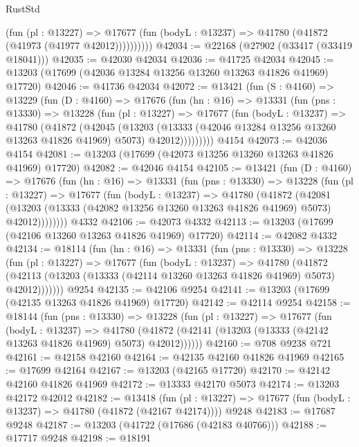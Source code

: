 \begin{lexlean}{RustStd}
\begin{coremodule}
              (fun (pl : @13227) =>
              @17677 (fun (bodyL : @13237) => @41780 (@41872 (@41973 (@41977 @42012))))))))))
@42034 := @22168 (@27902 (@33417 (@33419 @18041)))
@42035 := @42030 @42034
@42036 := @41725 @42034
@42045 := @13203 (@17699 (@42036 @13284 @13256 @13260 @13263 @41826 @41969) @17720)
@42046 := @41736 @42034
@42072 := @13421
    (fun (S : @4160) =>
    @13229
      (fun (D : @4160) =>
      @17676
        (fun (hn : @16) =>
        @13331
          (fun (pns : @13330) =>
          @13228
            (fun (pl : @13227) =>
            @17677
              (fun (bodyL : @13237) =>
              @41780
                (@41872
                  (@42045
                    (@13203
                      (@13333 (@42046 @13284 @13256 @13260 @13263 @41826 @41969) @5073)
                      @42012)))))))))
    @4154
@42073 := @42036 @4154
@42081 := @13203 (@17699 (@42073 @13256 @13260 @13263 @41826 @41969) @17720)
@42082 := @42046 @4154
@42105 := @13421
    (fun (D : @4160) =>
    @17676
      (fun (hn : @16) =>
      @13331
        (fun (pns : @13330) =>
        @13228
          (fun (pl : @13227) =>
          @17677
            (fun (bodyL : @13237) =>
            @41780
              (@41872
                (@42081
                  (@13203 (@13333 (@42082 @13256 @13260 @13263 @41826 @41969) @5073) @42012))))))))
    @4332
@42106 := @42073 @4332
@42113 := @13203 (@17699 (@42106 @13260 @13263 @41826 @41969) @17720)
@42114 := @42082 @4332
@42134 := @18114
    (fun (hn : @16) =>
    @13331
      (fun (pns : @13330) =>
      @13228
        (fun (pl : @13227) =>
        @17677
          (fun (bodyL : @13237) =>
          @41780
            (@41872
              (@42113 (@13203 (@13333 (@42114 @13260 @13263 @41826 @41969) @5073) @42012)))))))
    @9254
@42135 := @42106 @9254
@42141 := @13203 (@17699 (@42135 @13263 @41826 @41969) @17720)
@42142 := @42114 @9254
@42158 := @18144
    (fun (pns : @13330) =>
    @13228
      (fun (pl : @13227) =>
      @17677
        (fun (bodyL : @13237) =>
        @41780 (@41872 (@42141 (@13203 (@13333 (@42142 @13263 @41826 @41969) @5073) @42012))))))
@42160 := @708 @9238 @721
@42161 := @42158 @42160
@42164 := @42135 @42160 @41826 @41969
@42165 := @17699 @42164
@42167 := @13203 (@42165 @17720)
@42170 := @42142 @42160 @41826 @41969
@42172 := @13333 @42170 @5073
@42174 := @13203 @42172 @42012
@42182 := @13418
    (fun (pl : @13227) => @17677 (fun (bodyL : @13237) => @41780 (@41872 (@42167 @42174))))
    @9248
@42183 := @17687 @9248
@42187 := @13203 (@41722 (@17686 (@42183 @40766)))
@42188 := @17717 @9248
@42198 := @18191

\end{coremodule}
\end{lexlean}
